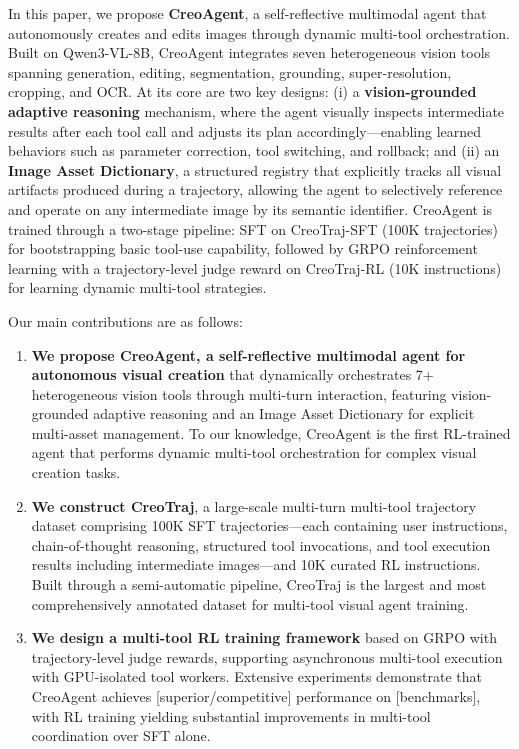 \documentclass{article}
\begin{document}
In this paper, we propose \textbf{CreoAgent}, a self-reflective multimodal agent that autonomously creates and edits images through dynamic multi-tool orchestration. Built on Qwen3-VL-8B, CreoAgent integrates seven heterogeneous vision tools spanning generation, editing, segmentation, grounding, super-resolution, cropping, and OCR. At its core are two key designs: (i) a \textbf{vision-grounded adaptive reasoning} mechanism, where the agent visually inspects intermediate results after each tool call and adjusts its plan accordingly—enabling learned behaviors such as parameter correction, tool switching, and rollback; and (ii) an \textbf{Image Asset Dictionary}, a structured registry that explicitly tracks all visual artifacts produced during a trajectory, allowing the agent to selectively reference and operate on any intermediate image by its semantic identifier. CreoAgent is trained through a two-stage pipeline: SFT on CreoTraj-SFT (100K trajectories) for bootstrapping basic tool-use capability, followed by GRPO reinforcement learning with a trajectory-level judge reward on CreoTraj-RL (10K instructions) for learning dynamic multi-tool strategies.

Our main contributions are as follows:

\begin{enumerate}
    \item \textbf{We propose CreoAgent, a self-reflective multimodal agent for autonomous visual creation} that dynamically orchestrates 7+ heterogeneous vision tools through multi-turn interaction, featuring vision-grounded adaptive reasoning and an Image Asset Dictionary for explicit multi-asset management. To our knowledge, CreoAgent is the first RL-trained agent that performs dynamic multi-tool orchestration for complex visual creation tasks.

    \item \textbf{We construct CreoTraj}, a large-scale multi-turn multi-tool trajectory dataset comprising 100K SFT trajectories—each containing user instructions, chain-of-thought reasoning, structured tool invocations, and tool execution results including intermediate images—and 10K curated RL instructions. Built through a semi-automatic pipeline, CreoTraj is the largest and most comprehensively annotated dataset for multi-tool visual agent training.

    \item \textbf{We design a multi-tool RL training framework} based on GRPO with trajectory-level judge rewards, supporting asynchronous multi-tool execution with GPU-isolated tool workers. Extensive experiments demonstrate that CreoAgent achieves [superior/competitive] performance on [benchmarks], with RL training yielding substantial improvements in multi-tool coordination over SFT alone.
\end{enumerate}
\end{document}
